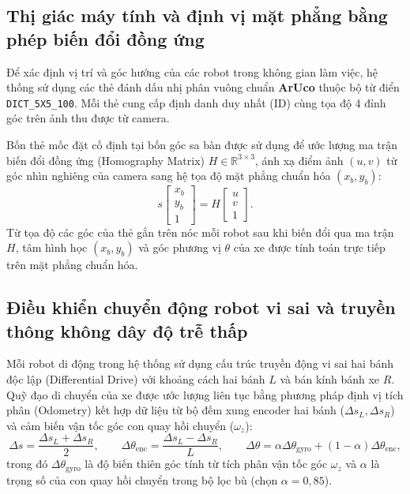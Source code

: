 \documentclass[12pt,a4paper]{report}
\begin{document}
	\subsection{Thị giác máy tính và định vị mặt phẳng bằng phép biến đổi đồng ứng}
	Để xác định vị trí và góc hướng của các robot trong không gian làm việc, hệ thống sử dụng các thẻ đánh dấu nhị phân vuông chuẩn \textbf{ArUco} thuộc bộ từ điển \texttt{DICT\_5X5\_100}. Mỗi thẻ cung cấp định danh duy nhất (ID) cùng tọa độ 4 đỉnh góc trên ảnh thu được từ camera.
	
	Bốn thẻ mốc đặt cố định tại bốn góc sa bàn được sử dụng để ước lượng ma trận biến đổi đồng ứng (Homography Matrix) $H \in \mathbb{R}^{3 \times 3}$, ánh xạ điểm ảnh $(u, v)$ từ góc nhìn nghiêng của camera sang hệ tọa độ mặt phẳng chuẩn hóa $(x_b, y_b)$:
	\begin{equation}
		s \begin{bmatrix} x_b \\ y_b \\ 1 \end{bmatrix} = H \begin{bmatrix} u \\ v \\ 1 \end{bmatrix}.
	\end{equation}
	Từ tọa độ các góc của thẻ gắn trên nóc mỗi robot sau khi biến đổi qua ma trận $H$, tâm hình học $(x_b, y_b)$ và góc phương vị $\theta$ của xe được tính toán trực tiếp trên mặt phẳng chuẩn hóa.
	
	\subsection{Điều khiển chuyển động robot vi sai và truyền thông không dây độ trễ thấp}
	Mỗi robot di động trong hệ thống sử dụng cấu trúc truyền động vi sai hai bánh độc lập (Differential Drive) với khoảng cách hai bánh $L$ và bán kính bánh xe $R$. Quỹ đạo di chuyển của xe được ước lượng liên tục bằng phương pháp định vị tích phân (Odometry) kết hợp dữ liệu từ bộ đếm xung encoder hai bánh ($\Delta s_L, \Delta s_R$) và cảm biến vận tốc góc con quay hồi chuyển ($\omega_z$):
	\begin{equation}
		\Delta s = \frac{\Delta s_L + \Delta s_R}{2}, \qquad \Delta \theta_{\text{enc}} = \frac{\Delta s_L - \Delta s_R}{L}, \qquad \Delta \theta = \alpha \Delta \theta_{\text{gyro}} + (1 - \alpha)\Delta \theta_{\text{enc}},
	\end{equation}
	trong đó $\Delta \theta_{\text{gyro}}$ là độ biến thiên góc tính từ tích phân vận tốc góc $\omega_z$ và $\alpha$ là trọng số của con quay hồi chuyển trong bộ lọc bù (chọn $\alpha = 0{,}85$).
	
\end{document}
